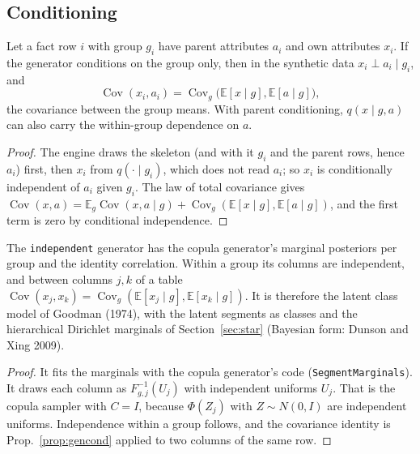 \subsection{Conditioning}
\begin{proposition}\label{prop:gencond}
Let a fact row $i$ with group $g_i$ have parent attributes $a_i$ and own attributes $x_i$. If the generator
conditions on the group only, then in the synthetic data $x_i\perp a_i\mid g_i$, and
\[\operatorname{Cov}(x_i,a_i)=\operatorname{Cov}_{g}\bigl(\mathbb E[x\mid g],\mathbb E[a\mid g]\bigr),\]
the covariance between the group means. With parent conditioning, $q(x\mid g,a)$ can also carry the within-group
dependence on $a$.
\end{proposition}
\begin{proof}
The engine draws the skeleton (and with it $g_i$ and the parent rows, hence $a_i$) first, then $x_i$ from
$q(\cdot\mid g_i)$, which does not read $a_i$; so $x_i$ is conditionally independent of $a_i$ given $g_i$. The law of
total covariance gives $\operatorname{Cov}(x,a)=\mathbb E_g\operatorname{Cov}(x,a\mid g)+\operatorname{Cov}_g(\mathbb
E[x\mid g],\mathbb E[a\mid g])$, and the first term is zero by conditional independence.
\end{proof}

\begin{proposition}\label{prop:genind}
The \texttt{independent} generator has the copula generator's marginal posteriors per group and the identity
correlation. Within a group its columns are independent, and between columns $j,k$ of a table
$\operatorname{Cov}(x_j,x_k)=\operatorname{Cov}_g(\mathbb E[x_j\mid g],\mathbb E[x_k\mid g])$. It is therefore the
latent class model of Goodman (1974), with the latent segments as classes and the hierarchical Dirichlet marginals of
Section~\ref{sec:star} (Bayesian form: Dunson and Xing 2009).
\end{proposition}
\begin{proof}
It fits the marginals with the copula generator's code (\texttt{SegmentMarginals}). It draws each column as
$F^{-1}_{g,j}(U_j)$ with independent uniforms $U_j$. That is the copula sampler with $C=I$, because $\Phi(Z_j)$ with
$Z\sim N(0,I)$ are independent uniforms. Independence within a group follows, and the covariance identity is
Prop.~\ref{prop:gencond} applied to two columns of the same row.
\end{proof}

